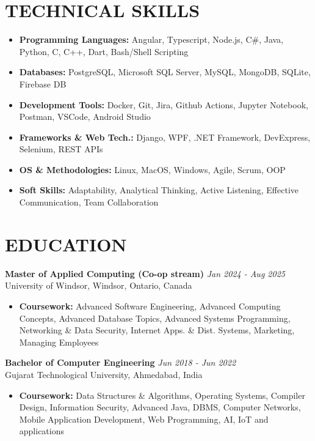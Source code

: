 \documentclass[10pt, letterpaper]{article}
\begin{document}
\section{TECHNICAL SKILLS}  
\vspace{0.1cm}
\begin{itemize}
    \item \textbf{Programming Languages:} Angular, Typescript, Node.js, C\#, Java, Python, C, C++, Dart, Bash/Shell Scripting
    \item \textbf{Databases:} PostgreSQL, Microsoft SQL Server, MySQL, MongoDB, SQLite, Firebase DB
    \item \textbf{Development Tools:} Docker, Git, Jira, Github Actions, Jupyter Notebook, Postman, VSCode, Android Studio
    \item \textbf{Frameworks \& Web Tech.:} Django, WPF, .NET Framework, DevExpress, Selenium, REST APIs
    \item \textbf{OS \& Methodologies:} Linux, MacOS, Windows, Agile, Scrum, OOP
    \item \textbf{Soft Skills:} Adaptability, Analytical Thinking, Active Listening, Effective Communication, Team Collaboration
\end{itemize}
\vspace{0.1cm}
\section{EDUCATION}
\vspace{0.1cm}
\textbf{Master of Applied Computing (Co-op stream) } \hfill \textit{Jan 2024 - Aug 2025} \\
University of Windsor, Windsor, Ontario, Canada 
\begin{itemize}
    \item \textbf{Coursework:} Advanced Software Engineering, Advanced Computing Concepts, Advanced Database Topics, Advanced Systems Programming, Networking \& Data Security, Internet Apps. \& Dist. Systems, Marketing, Managing Employees
\end{itemize}
\vspace{0.3cm}
\textbf{Bachelor of Computer Engineering} \hfill \textit{Jun 2018 - Jun 2022} \\
Gujarat Technological University, Ahmedabad, India 
\begin{itemize}
    \item \textbf{Coursework:} Data Structures \& Algorithms, Operating Systems, Compiler Design, Information Security, Advanced Java, DBMS, Computer Networks, Mobile Application Development, Web Programming, AI, IoT and applications
\end{itemize}
\vspace{0.1cm}
\end{document}
